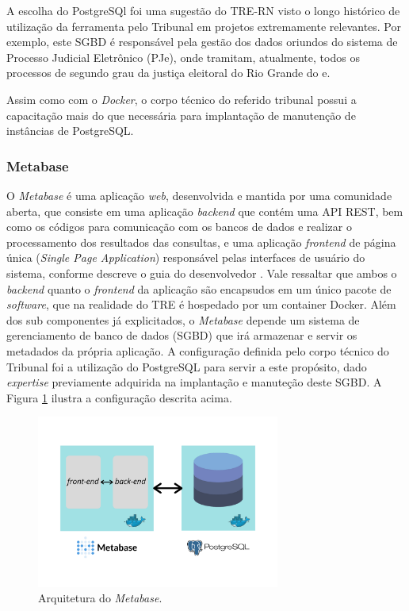 A escolha do PostgreSQl foi uma sugestão do TRE-RN visto o longo histórico de utilização da ferramenta pelo Tribunal em projetos extremamente relevantes. Por exemplo, este SGBD é responsável pela gestão dos dados oriundos do sistema de Processo Judicial Eletrônico (PJe), onde tramitam, atualmente, todos os processos de segundo grau da justiça eleitoral do Rio Grande do e.

Assim como com o \textit{Docker}, o corpo técnico do referido tribunal possui a capacitação mais do que necessária para implantação de manutenção de instâncias de PostgreSQL. 

\subsubsection{Metabase}

O \textit{Metabase} é uma aplicação \textit{web}, desenvolvida e mantida por uma comunidade aberta, que consiste em uma aplicação \textit{backend} que contém uma API REST, bem como os códigos para comunicação com os bancos de dados e realizar o processamento dos resultados das consultas, e uma aplicação \textit{frontend} de página única (\textit{Single Page Application}) responsável pelas interfaces de usuário do sistema, conforme descreve o guia do desenvolvedor \cite{metabaseeevguide}. Vale ressaltar que ambos o \textit{backend} quanto o \textit{frontend} da aplicação são encapsudos em um único pacote de \textit{software}, que na realidade do TRE é hospedado por um container Docker.
Além dos sub componentes já explicitados, o \textit{Metabase} depende um sistema de gerenciamento de banco de dados (SGBD) que irá armazenar e servir os metadados da própria aplicação. A configuração definida pelo corpo técnico do Tribunal foi a utilização do PostgreSQL para servir a este propósito, dado \textit{expertise} previamente adquirida na implantação e manuteção deste SGBD. A Figura \ref{fig:arq_metabase} ilustra a configuração descrita acima. 

\begin{figure}[htp]
   \centering
    \includegraphics[width=8cm]{Imagens/Arq_Metabase}
    \caption{Arquitetura do \textit{Metabase}.}
    \label{fig:arq_metabase}
\end{figure} 


